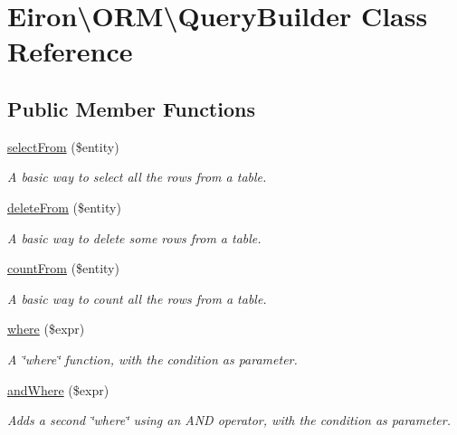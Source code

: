 \hypertarget{class_eiron_1_1_o_r_m_1_1_query_builder}{}\section{Eiron\textbackslash{}O\+RM\textbackslash{}Query\+Builder Class Reference}
\label{class_eiron_1_1_o_r_m_1_1_query_builder}
\subsection*{Public Member Functions}
\begin{DoxyCompactItemize}
\item 
\hyperlink{class_eiron_1_1_o_r_m_1_1_query_builder_a645141629fc019777b639484a7c87e52}{select\+From} (\$entity)
\begin{DoxyCompactList}\small\item\em A basic way to select all the rows from a table. \end{DoxyCompactList}\item 
\hyperlink{class_eiron_1_1_o_r_m_1_1_query_builder_af16b3d263aedfcc26a7793cfc4a77d9a}{delete\+From} (\$entity)
\begin{DoxyCompactList}\small\item\em A basic way to delete some rows from a table. \end{DoxyCompactList}\item 
\hyperlink{class_eiron_1_1_o_r_m_1_1_query_builder_a377df83c0a416273528739f5b3bb839b}{count\+From} (\$entity)
\begin{DoxyCompactList}\small\item\em A basic way to count all the rows from a table. \end{DoxyCompactList}\item 
\hyperlink{class_eiron_1_1_o_r_m_1_1_query_builder_a2e1577915ea45bbf42572f7bba0b20f4}{where} (\$expr)
\begin{DoxyCompactList}\small\item\em A \char`\"{}where\char`\"{} function, with the condition as parameter. \end{DoxyCompactList}\item 
\hyperlink{class_eiron_1_1_o_r_m_1_1_query_builder_ad75c121d7c9458f3c9d54b2967179060}{and\+Where} (\$expr)
\begin{DoxyCompactList}\small\item\em Adds a second \char`\"{}where\char`\"{} using an A\+ND operator, with the condition as parameter. \end{DoxyCompactList}\item 

\end{DoxyCompactItemize}

